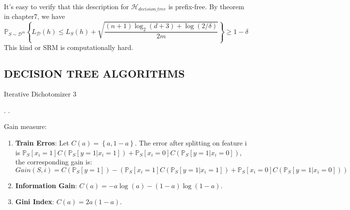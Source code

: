 It's easy to verify that this description for $ \mathcal{H}_{decision\_tree} $ is prefix-free.
By theorem in chapter7, we have
\[
    \mathbb{P}_{S \sim \mathcal{D}^m} \left\{ L_{\mathcal{D}}(h) \le L_{S}(h) + \sqrt{ \frac{(n+1)\log_2(d+3) + \log(2/\delta)}{2m} } \right\} \ge 1-\delta
\]
This kind or SRM is computationally hard.

\subsection{DECISION TREE ALGORITHMS}%
\label{sub:j}

\begin{algorithm}[H]
    \caption{Iterative Dichotomizer 3}
    \begin{algorithmic}
        .
        .
    \end{algorithmic}
\end{algorithm}

Gain measure:
\begin{enumerate}
    \item \textbf{Train Erros}: Let $ C(a) = \left\{ a, 1-a \right\} $.
        The error after splitting on feature i is
        $
            \mathbb{P}_{S} [x_i = 1] C(\mathbb{P}_{S} [y=1 | x_i=1]) + \mathbb{P}_{S} [x_i = 0] C(\mathbb{P}_{S} [y=1 | x_i = 0])
        $, the corresponding gain is:
        \[
            Gain(S,i) = C(\mathbb{P}_{S} [y=1]) - 
            \left(\mathbb{P}_{S} [x_i = 1] C(\mathbb{P}_{S} [y=1 | x_i=1]) 
            + \mathbb{P}_{S} [x_i = 0] C(\mathbb{P}_{S} [y=1 | x_i = 0]) \right)
        \]
    \item \textbf{Information Gain}: $ C(a) = -a \log(a) - (1-a)\log(1-a) $.
    \item \textbf{Gini Index}: $ C(a) = 2a(1-a) $.
\end{enumerate}

